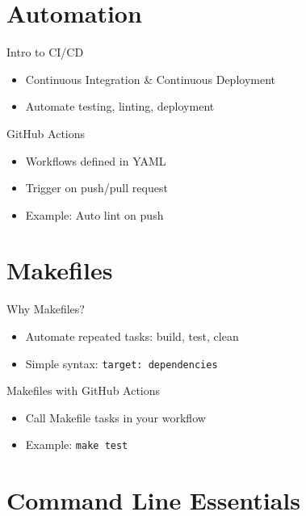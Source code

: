 \documentclass[aspectratio=169]{beamer} %
\begin{document}
\section{Automation}

\begin{frame}{Intro to CI/CD}
  \begin{itemize}
    \item Continuous Integration \& Continuous Deployment
    \item Automate testing, linting, deployment
  \end{itemize}
\end{frame}

\begin{frame}{GitHub Actions}
  \begin{itemize}
    \item Workflows defined in YAML
    \item Trigger on push/pull request
    \item Example: Auto lint on push
  \end{itemize}
\end{frame}

\section{Makefiles}

\begin{frame}{Why Makefiles?}
  \begin{itemize}
    \item Automate repeated tasks: build, test, clean
    \item Simple syntax: \texttt{target: dependencies}
  \end{itemize}
\end{frame}

\begin{frame}{Makefiles with GitHub Actions}
  \begin{itemize}
    \item Call Makefile tasks in your workflow
    \item Example: \texttt{make test}
  \end{itemize}
\end{frame}

\section{Command Line Essentials}
\end{document}
